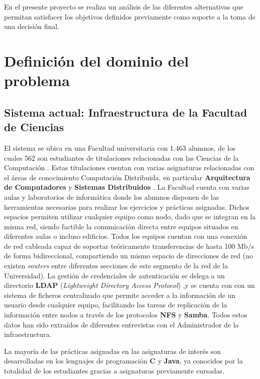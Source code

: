 En el presente proyecto se realiza un análisis de las diferentes alternativas que permitan satisfacer los objetivos definidos previamente como soporte a la toma de una decisión final.

\section{Definición del dominio del problema}

\subsection{Sistema actual: Infraestructura de la Facultad de Ciencias}
\label{dominioproblema:infraestructura}
El sistema se ubica en una Facultad universitaria con 1.463 alumnos, de los cuales 562 son estudiantes de titulaciones relacionadas con las Ciencias de la Computación \cite{uecusal:estudiantes}. Estas titulaciones cuentan con varias asignaturas relacionadas con el áreas de conocimiento Computación Distribuida, en particular \textbf{Arquitectura de Computadores} y \textbf{Sistemas Distribuidos} \cite{DIA15GuiaAcademica}. La Facultad cuenta con varias aulas y laboratorios de informática donde los alumnos disponen de las herramientas necesarias para realizar los ejercicios y prácticas asignadas. Dichos espacios permiten utilizar cualquier equipo como nodo, dado que se integran en la misma red, siendo factible la comunicación directa entre equipos situados en diferentes aulas o incluso edificios. Todos los equipos cuentan con una conexión de red cableada capaz de soportar teóricamente transferencias de hasta 100 Mb/s de forma bidireccional, compartiendo un mismo espacio de direcciones de red (no existen \textit{routers} entre diferentes secciones de este segmento de la red de la Universidad). La gestión de credenciales de autenticación se delega a un directorio \textbf{LDAP} (\textit{Lightweight Directory Access Protocol}) \cite{RFC4516-comment},y se cuenta con con un sistema de ficheros centralizado que permite acceder a la información de un usuario desde cualquier equipo, facilitando las tareas de replicación de la información entre nodos a través de los protocolos \textbf{NFS} y \textbf{Samba}. Todos estos datos han sido extraídos de diferentes entrevistas con el Administrador de la infraestructura.

La mayoría de las prácticas asignadas en las asignaturas de interés son desarrolladas en los lenguajes de programación \textbf{C} y \textbf{Java}, ya conocidos por la totalidad de los estudiantes gracias a asignaturas previamente cursadas.

